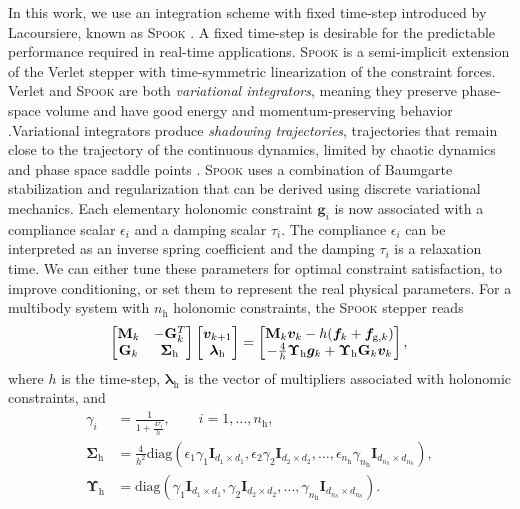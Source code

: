 \documentclass[preprint,12pt]{elsarticle}
\let\vec\bm
\let\mat\mathbf
\numberwithin{equation}{section}
\def\tg{\text{g}}
\def\th{\text{h}}
\def\lambdah{\vec{\lambda}_{\text{h}}}
\begin{document}
In this work, we use an integration scheme with fixed time-step introduced by Lacoursiere, known as \textsc{Spook}  \cite{lacoursiere2007ghosts}.
A fixed time-step is desirable for the predictable performance required in real-time applications. \textsc{Spook} is a semi-implicit extension of the Verlet stepper with time-symmetric linearization of the constraint forces.
Verlet and \textsc{Spook} are both \emph{variational integrators}, meaning they preserve phase-space volume and have good energy and momentum-preserving behavior \cite{hairer2006geometric}.Variational integrators produce \emph{shadowing trajectories}, trajectories that remain close to the trajectory of the continuous dynamics, limited by chaotic dynamics and phase space saddle points \cite{chandramoorthy2021probability}.
\textsc{Spook} uses a combination of Baumgarte stabilization and regularization that can be derived using discrete variational mechanics.
Each elementary holonomic constraint $\vec{g}_i$ is now associated with a compliance scalar $\epsilon_{i}$ and a damping scalar $\tau_{i}$. The compliance $\epsilon_{i}$ can be interpreted as an inverse spring coefficient and the damping $\tau_{i}$ is a relaxation time.
We can either tune these parameters for optimal constraint satisfaction, to improve conditioning, or set them to represent the real physical parameters.
For a multibody system with $n_\th$ holonomic constraints, the \textsc{Spook} stepper reads
\begin{equation}
    \label{eq:spook_holonomic}
    \begin{bmatrix}
        \mat{M}_k & -\mat{G}_k^T \\
        \mat{G}_k & \vec{\Sigma}_\th
    \end{bmatrix}
    \begin{bmatrix}
        \vec{v}_{k+1} \\
        \lambdah
    \end{bmatrix}
    =
    \begin{bmatrix}
        \mat{M}_k \vec{v}_k - h (\vec{f}_k + \vec{f}_{\tg,k}) \\
        -\frac{4}{h} \vec{\Upsilon}_\th \vec{g}_k + \vec{\Upsilon}_\th \mat{G}_k \vec{v}_k
    \end{bmatrix}, \\
\end{equation}
where $h$ is the time-step, $\lambdah$ is the vector of multipliers associated with holonomic constraints, and
\begin{align}
    \label{eq:upsilon}
    \gamma_{i} & = \frac{1}{1 + \frac{4 \tau_{i}}{h}}, \qquad i=1,\hdots,n_\th,            \\
    \mat{\Sigma}_\th   & =  \frac{4}{h^2}\text{diag}(
    \epsilon_{1} \gamma_{1} \mat{I}_{d_1 \times d_1},
    \epsilon_{2} \gamma_{2} \mat{I}_{d_2 \times d_2},
    \hdots,
    \epsilon_{n_\th} \gamma_{n_\th} \mat{I}_{d_{n_h} \times d_{n_h}}
    ),                                                                                           \\
    \mat{\Upsilon}_\th & = \text{diag}(\gamma_{1} \mat{I}_{d_1 \times d_1}, \gamma_{2} \mat{I}_{d_2 \times d_2}, \hdots,\gamma_{n_\th} \mat{I}_{d_{n_h} \times d_{n_h}}).
\end{align}
\end{document}
